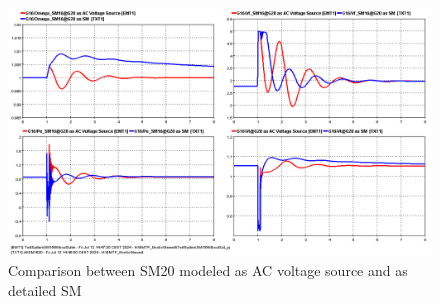 \documentclass{report}
\begin{document}
\begin{figure}
    \centering
    \includegraphics[width=0.9\linewidth]{Figure_Nordic/Results/EMTPG16G20.png}
    \caption{Comparison between SM20 modeled as AC voltage source and as detailed SM}
    \label{fig:SMIB16Comp}
\end{figure}
\end{document}
